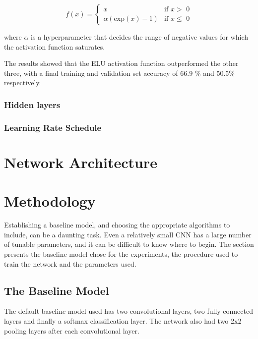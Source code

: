 \documentclass[]{article}
\begin{document}
\begin{equation} \label{eq:elu}
f(x) = \begin{cases}
x &\text{if $x >$ 0}\\ \alpha (\text{exp}(x) - 1) &\text{if  $x \leq$ 0}
\end{cases}
\end{equation}

where \(\alpha\) is a hyperparameter that decides the range of negative values for which the activation function saturates.

The results showed that the ELU activation function outperformed the other three, with a final training and validation set accuracy of 66.9 \% and 50.5\% respectively. 

\subsubsection{Hidden layers}

\subsubsection{Learning Rate Schedule}

\section{Network Architecture}



\section{Methodology}

Establishing a baseline model, and choosing the appropriate algorithms to include, can be a daunting task. Even a relatively small CNN has a large number of tunable parameters, and it can be difficult to know where to begin. The section presents the baseline model chose for the experiments, the procedure used to train the network and the parameters used. 

\subsection{The Baseline Model}

The default baseline model used has two convolutional layers, two fully-connected layers and finally a softmax classification layer. The network also had two 2x2 pooling layers after each convolutional layer. 
\end{document}
